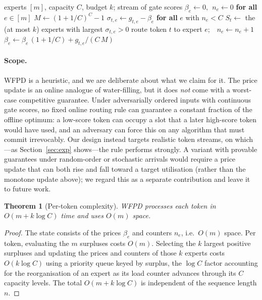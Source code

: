 \documentclass[preprint,12pt]{elsarticle}
\theoremstyle{plain}
\newtheorem{theorem}{Theorem}
\theoremstyle{remark}
\begin{document}
\begin{algorithm}[t]
\caption{Water-Filling Router (WFPD)}
\label{alg:wfpd}
\begin{algorithmic}[1]
\Require experts $[m]$, capacity $C$, budget $k$; stream of gate scores
\State $\beta_e\gets 0,\ \ n_e\gets 0$ \textbf{ for all } $e\in[m]$
\State $M\gets (1+1/C)^{C}-1$
  \State $\sigma_{t,e}\gets g_{t,e}-\beta_e$ \textbf{ for all } $e$ with $n_e<C$
  \State $S_t\gets$ the (at most $k$) experts with largest $\sigma_{t,e}>0$
     \State route token $t$ to expert $e$;\ \ $n_e\gets n_e+1$
     \State $\beta_e\gets \beta_e\,(1+1/C)+g_{t,e}/(C\,M)$
  \EndFor
\EndFor
\end{algorithmic}
\end{algorithm}

\paragraph{Scope.}
WFPD is a heuristic, and we are deliberate about what we claim for it. The
price update is an online analogue of water-filling, but it does \emph{not}
come with a worst-case competitive guarantee. Under adversarially ordered
inputs with continuous gate scores, no fixed online routing rule can
guarantee a constant fraction of the offline optimum: a low-score token can
occupy a slot that a later high-score token would have used, and an
adversary can force this on any algorithm that must commit irrevocably. Our
design instead targets realistic token streams, on which---as
Section~\ref{sec:exp} shows---the rule performs strongly. A variant with
provable guarantees under random-order or stochastic arrivals would require
a price update that can both rise and fall toward a target utilisation
(rather than the monotone update above); we regard this as a separate
contribution and leave it to future work.

\begin{theorem}[Per-token complexity]
\label{thm:complexity}
WFPD processes each token in $O(m+k\log C)$ time and uses $O(m)$ space.
\end{theorem}

\begin{proof}
The state consists of the prices $\beta_e$ and counters $n_e$, i.e.\ $O(m)$
space. Per token, evaluating the $m$ surpluses costs $O(m)$. Selecting the
$k$ largest positive surpluses and updating the prices and counters of those
$k$ experts costs $O(k\log C)$ using a priority queue keyed by surplus, the
$\log C$ factor accounting for the reorganisation of an expert as its load
counter advances through its $C$ capacity levels. The total $O(m+k\log C)$
is independent of the sequence length $n$.
\end{proof}
\end{document}
